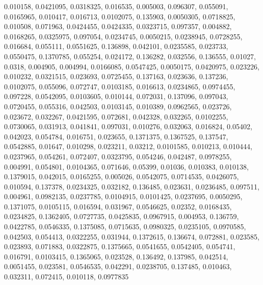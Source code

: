 0.010158, 0.0421095, 0.0318325, 0.016535, 0.005003, 0.096307, 0.055091, 0.0165965, 0.010417, 0.016713, 0.0102075, 0.135903, 0.0050305, 0.0718825, 0.010508, 0.071963, 0.0424455, 0.0424335, 0.0323715, 0.097357, 0.004882, 0.0168265, 0.0325975, 0.097054, 0.0234745, 0.0050215, 0.0238945, 0.0728255, 0.016684, 0.055111, 0.0551625, 0.136898, 0.042101, 0.0235585, 0.023733, 0.0550475, 0.1370785, 0.055254, 0.024172, 0.136282, 0.032556, 0.136555, 0.01027, 0.0318, 0.004905, 0.004994, 0.0166085, 0.0547425, 0.0050175, 0.0420975, 0.023226, 0.010232, 0.0321515, 0.023693, 0.0725455, 0.137163, 0.023636, 0.137236, 0.0102075, 0.055096, 0.072747, 0.0103185, 0.016613, 0.0234865, 0.0974455, 0.097228, 0.0542095, 0.0103605, 0.010144, 0.072031, 0.137096, 0.097043, 0.0720455, 0.055316, 0.042503, 0.0103145, 0.010389, 0.0962565, 0.023726, 0.023672, 0.032267, 0.0421595, 0.072681, 0.042328, 0.032265, 0.0102255, 0.0730065, 0.031913, 0.041841, 0.097031, 0.010276, 0.032063, 0.016824, 0.05402, 0.042023, 0.054784, 0.016751, 0.023655, 0.1371375, 0.1367525, 0.137547, 0.0542885, 0.01647, 0.010298, 0.023211, 0.03212, 0.0101585, 0.010213, 0.010444, 0.0237965, 0.054261, 0.072407, 0.0323795, 0.054246, 0.042487, 0.0978255, 0.004991, 0.054801, 0.0104365, 0.071646, 0.05399, 0.01036, 0.010383, 0.010138, 0.1379015, 0.042015, 0.0165255, 0.005026, 0.0542075, 0.0714535, 0.0426075, 0.010594, 0.137378, 0.0234325, 0.032182, 0.136485, 0.023631, 0.0236485, 0.097511, 0.004961, 0.0982135, 0.0237785, 0.0104915, 0.0101425, 0.0237695, 0.0050295, 0.1371075, 0.0105115, 0.016594, 0.031967, 0.0546625, 0.02352, 0.0168435, 0.0234825, 0.1362405, 0.0727735, 0.0425835, 0.0967915, 0.004953, 0.136759, 0.0422785, 0.0546335, 0.1375085, 0.0715635, 0.0980325, 0.0235105, 0.0970585, 0.042503, 0.054413, 0.0322255, 0.031944, 0.1372615, 0.136674, 0.072881, 0.023585, 0.023893, 0.071883, 0.0322875, 0.1375665, 0.0541655, 0.0542405, 0.054741, 0.016791, 0.0103415, 0.1365065, 0.023528, 0.136492, 0.137985, 0.042514, 0.0051455, 0.023581, 0.0546535, 0.042291, 0.0238705, 0.137485, 0.010463, 0.032311, 0.072415, 0.010118, 0.0977835